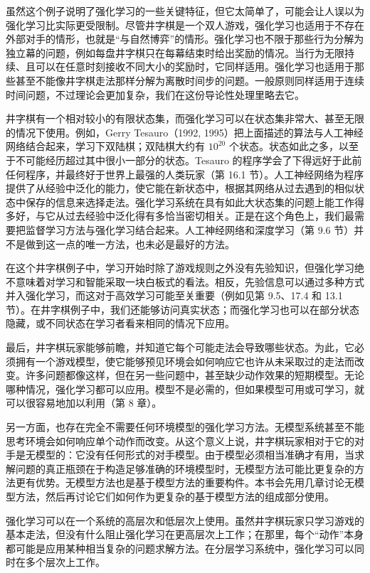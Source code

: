 \documentclass[UTF8,12pt,a4paper,fontset=fandol]{ctexart}
\begin{document}
虽然这个例子说明了强化学习的一些关键特征，但它太简单了，可能会让人误以为强化学习比实际更受限制。尽管井字棋是一个双人游戏，强化学习也适用于不存在外部对手的情形，也就是“与自然博弈”的情形。强化学习也不限于那些行为分解为独立幕的问题，例如每盘井字棋只在每幕结束时给出奖励的情况。当行为无限持续、且可以在任意时刻接收不同大小的奖励时，它同样适用。强化学习也适用于那些甚至不能像井字棋走法那样分解为离散时间步的问题。一般原则同样适用于连续时间问题，不过理论会更加复杂，我们在这份导论性处理里略去它。

井字棋有一个相对较小的有限状态集，而强化学习可以在状态集非常大、甚至无限的情况下使用。例如，Gerry Tesauro（1992, 1995）把上面描述的算法与人工神经网络结合起来，学习下双陆棋；双陆棋大约有 $10^{20}$ 个状态。状态如此之多，以至于不可能经历超过其中很小一部分的状态。Tesauro 的程序学会了下得远好于此前任何程序，并最终好于世界上最强的人类玩家（第 16.1 节）。人工神经网络为程序提供了从经验中泛化的能力，使它能在新状态中，根据其网络从过去遇到的相似状态中保存的信息来选择走法。强化学习系统在具有如此大状态集的问题上能工作得多好，与它从过去经验中泛化得有多恰当密切相关。正是在这个角色上，我们最需要把监督学习方法与强化学习结合起来。人工神经网络和深度学习（第 9.6 节）并不是做到这一点的唯一方法，也未必是最好的方法。

在这个井字棋例子中，学习开始时除了游戏规则之外没有先验知识，但强化学习绝不意味着对学习和智能采取一块白板式的看法。相反，先验信息可以通过多种方式并入强化学习，而这对于高效学习可能至关重要（例如见第 9.5、17.4 和 13.1 节）。在井字棋例子中，我们还能够访问真实状态；而强化学习也可以在部分状态隐藏，或不同状态在学习者看来相同的情况下应用。

最后，井字棋玩家能够前瞻，并知道它每个可能走法会导致哪些状态。为此，它必须拥有一个游戏模型，使它能够预见环境会如何响应它也许从未采取过的走法而改变。许多问题都像这样，但在另一些问题中，甚至缺少动作效果的短期模型。无论哪种情况，强化学习都可以应用。模型不是必需的，但如果模型可用或可学习，就可以很容易地加以利用（第 8 章）。

另一方面，也存在完全不需要任何环境模型的强化学习方法。无模型系统甚至不能思考环境会如何响应单个动作而改变。从这个意义上说，井字棋玩家相对于它的对手是无模型的：它没有任何形式的对手模型。由于模型必须相当准确才有用，当求解问题的真正瓶颈在于构造足够准确的环境模型时，无模型方法可能比更复杂的方法更有优势。无模型方法也是基于模型方法的重要构件。本书会先用几章讨论无模型方法，然后再讨论它们如何作为更复杂的基于模型方法的组成部分使用。

强化学习可以在一个系统的高层次和低层次上使用。虽然井字棋玩家只学习游戏的基本走法，但没有什么阻止强化学习在更高层次上工作；在那里，每个“动作”本身都可能是应用某种相当复杂的问题求解方法。在分层学习系统中，强化学习可以同时在多个层次上工作。
\end{document}
